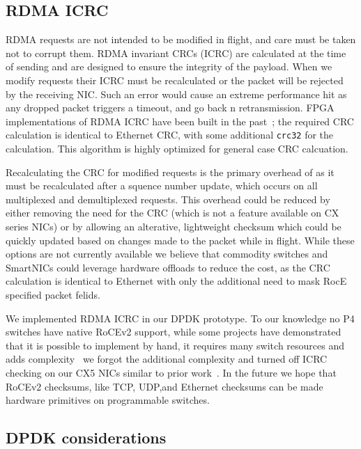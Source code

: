 \subsection{RDMA ICRC}

RDMA requests are not intended to be modified in flight, and care must
be taken not to corrupt them. RDMA invariant CRCs (ICRC) are
calculated at the time of sending and are designed to ensure the
integrity of the payload. When we modify requests their ICRC must be
recalculated or the packet will be rejected by the receiving NIC. Such
an error would cause an extreme performance hit as any dropped packet
triggers a timeout, and go back n retransmission.  FPGA
implementations of RDMA ICRC have been built in the
past~\cite{Mansour_2019}; the required CRC calculation is identical to
Ethernet CRC, with some additional \texttt{crc32} for the
calculation. This algorithm is highly optimized for general case CRC
calcuation.

Recalculating the CRC for modified requests is the primary overhead of {\sword}
as it must be recalculated after a squence number update, which occurs on all
multiplexed and demultiplexed requests. This overhead could be reduced by either
removing the need for the CRC (which is not a feature available on CX series
NICs) or by allowing an alterative, lightweight checksum which could be quickly
updated based on changes made to the packet while in flight. While these options
are not currently available we believe that commodity switches and SmartNICs
could leverage hardware offloads to reduce the cost, as the CRC calculation is
identical to Ethernet with only the additional need to mask RocE specified
packet felids.

We implemented RDMA ICRC in our DPDK prototype. To our knowledge no P4 switches
have native RoCEv2 support, while some projects have demonstrated that it is
possible to implement by hand, it requires many switch resources and adds
complexity~\todo{~\cite{}} we forgot the additional complexity and turned off
ICRC checking on our CX5 NICs similar to prior work~\cite{switchml}. In the
future we hope that RoCEv2 checksums, like TCP, UDP,and Ethernet checksums can
be made hardware primitives on programmable switches.

\subsection{DPDK considerations}

